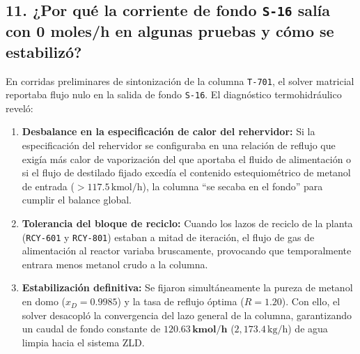 \documentclass[11pt,a4paper]{article}
\begin{document}
\subsection{11. ¿Por qué la corriente de fondo \texttt{S-16} salía con 0 moles/h en algunas pruebas y cómo se estabilizó?}
En corridas preliminares de sintonización de la columna \texttt{T-701}, el solver matricial reportaba flujo nulo en la salida de fondo \texttt{S-16}. El diagnóstico termohidráulico reveló:
\begin{enumerate}
    \item \textbf{Desbalance en la especificación de calor del rehervidor:} Si la especificación del rehervidor se configuraba en una relación de reflujo que exigía más calor de vaporización del que aportaba el fluido de alimentación o si el flujo de destilado fijado excedía el contenido estequiométrico de metanol de entrada ($>117.5\,\text{kmol/h}$), la columna ``se secaba en el fondo'' para cumplir el balance global.
    \item \textbf{Tolerancia del bloque de reciclo:} Cuando los lazos de reciclo de la planta (\texttt{RCY-601} y \texttt{RCY-801}) estaban a mitad de iteración, el flujo de gas de alimentación al reactor variaba bruscamente, provocando que temporalmente entrara menos metanol crudo a la columna.
    \item \textbf{Estabilización definitiva:} Se fijaron simultáneamente la pureza de metanol en domo ($x_D = 0.9985$) y la tasa de reflujo óptima ($R = 1.20$). Con ello, el solver desacopló la convergencia del lazo general de la columna, garantizando un caudal de fondo constante de $\mathbf{120.63\,\text{kmol/h}}$ ($2{,}173.4\,\text{kg/h}$) de agua limpia hacia el sistema ZLD.
\end{enumerate}
\end{document}
